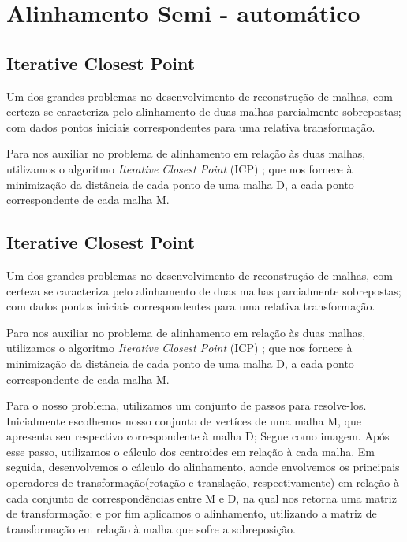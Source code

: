 \section{Alinhamento Semi - automático}
\label{sec:technique}

\subsection{Iterative Closest Point}

Um dos grandes problemas no desenvolvimento de reconstrução de malhas, com certeza se caracteriza pelo alinhamento de duas malhas parcialmente sobrepostas; com dados pontos iniciais correspondentes para uma relativa transformação.

Para nos auxiliar no problema de alinhamento em relação às duas malhas, utilizamos o algoritmo \textit{Iterative Closest Point} (ICP) \cite{Zhang:1994}; que nos fornece à minimização da distância de cada ponto de uma malha D, a cada ponto correspondente de cada malha M.

\subsection{Iterative Closest Point}

Um dos grandes problemas no desenvolvimento de reconstrução de malhas, com certeza se caracteriza pelo alinhamento de duas malhas parcialmente sobrepostas; com dados pontos iniciais correspondentes para uma relativa transformação.

Para nos auxiliar no problema de alinhamento em relação às duas malhas, utilizamos o algoritmo \textit{Iterative Closest Point} (ICP) \cite{Zhang:1994}; que nos fornece à minimização da distância de cada ponto de uma malha D, a cada ponto correspondente de cada malha M.

Para o nosso problema, utilizamos um conjunto de passos para resolve-los. Inicialmente escolhemos nosso conjunto de vertíces de uma malha M, que apresenta seu respectivo correspondente à malha D; Segue  como imagem. Após esse passo, utilizamos o cálculo dos centroides em relação à cada malha. Em seguida, desenvolvemos o cálculo do alinhamento, aonde envolvemos os principais operadores de transformação(rotação e translação, respectivamente) em relação à cada conjunto de correspondências entre M e D, na qual nos retorna uma matriz de transformação; e por fim aplicamos o alinhamento, utilizando a matriz de transformação em relação à malha que sofre a sobreposição.

